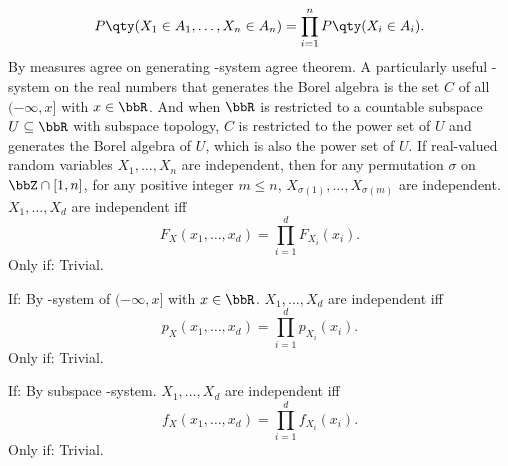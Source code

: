 \documentclass[a4paper,12pt]{report}
\begin{document}
\[P\qty(X_1\in A_1,\ldots,X_n\in A_n)=\prod_{i=1}^nP\qty(X_i\in A_i).\]
\bpr
By measures agree on generating \textpi-system agree theorem.
\epr
A particularly useful \textpi-system on the real numbers that generates the Borel algebra is the set $C$ of all $(-\infty,x]$ with $x\in\bbR$. And when $\bbR$ is restricted to a countable subspace $U\subseteq\bbR$ with subspace topology, $C$ is restricted to the power set of $U$ and generates the Borel algebra of $U$, which is also the power set of $U$.
If real-valued random variables $X_1,\ldots,X_n$ are independent, then for any permutation $\sigma$ on $\bbZ\cap[1,n]$, for any positive integer $m\le n$, $X_{\sigma(1)},\ldots,X_{\sigma(m)}$ are independent.
$X_1,\ldots,X_d$ are independent iff
\[F_X(x_1,\ldots,x_d)=\prod_{i=1}^dF_{X_i}(x_i).\]
\bpr
Only if: Trivial.

If: By \textpi-system of $(-\infty,x]$ with $x\in\bbR$.
\epr
{}
$X_1,\ldots,X_d$ are independent iff
\[p_X(x_1,\ldots,x_d)=\prod_{i=1}^dp_{X_i}(x_i).\]
\bpr
Only if: Trivial.

If: By subspace \textpi-system.
\epr
{}
$X_1,\ldots,X_d$ are independent iff
\[f_X(x_1,\ldots,x_d)=\prod_{i=1}^df_{X_i}(x_i).\]
\bpr
Only if: Trivial.
\end{document}
